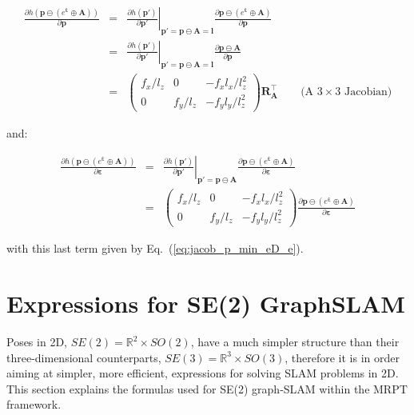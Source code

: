 \documentclass[a4paper,11pt]{report}
\newcommand{\E}{{\bm{\varepsilon}}}
\newcommand{\A}{{\mathbf{A}}}
\begin{document}
\begin{eqnarray}
\frac{\partial h(\mathbf{p} \ominus (e^\E \oplus \A) )}{\partial \mathbf{p}}
&=&
\left. \frac{\partial h(\mathbf{p'})}{\partial \mathbf{p'}} \right|_{ \mathbf{p'} = \mathbf{p} \ominus \A = \mathbf{l} }
\frac{\partial \mathbf{p} \ominus (e^\E \oplus \A) }{\partial \mathbf{p}} \\
&=&
\left. \frac{\partial h(\mathbf{p'})}{\partial \mathbf{p'}} \right|_{ \mathbf{p'} = \mathbf{p} \ominus \A = \mathbf{l} }
\frac{\partial \mathbf{p} \ominus \A }{\partial \mathbf{p}} \\
&=&
\left(
\begin{array}{ccc}
 f_x / l_z   &    0    &  -f_x l_x / l_z^2   \\
 0 & f_y / l_z  &  -f_y l_y / l_z^2
\end{array}
\right)
\mathbf{R_A^\top}
\quad\quad \text{(A $3 \times 3$ Jacobian)}
\end{eqnarray}

\noindent and:

\begin{eqnarray}
\frac{\partial h(\mathbf{p} \ominus (e^\E \oplus \A) )}{\partial \E}
&=&
\left. \frac{\partial h(\mathbf{p'})}{\partial \mathbf{p'}} \right|_{ \mathbf{p'} = \mathbf{p} \ominus \A }
\frac{\partial \mathbf{p} \ominus (e^\E \oplus \A) }{\partial \E} \\
&=&
\left(
\begin{array}{ccc}
 f_x / l_z   &    0    &  -f_x l_x / l_z^2   \\
 0 & f_y / l_z  &  -f_y l_y / l_z^2
\end{array}
\right)
\frac{\partial \mathbf{p} \ominus (e^\E \oplus \A) }{\partial \E}
\end{eqnarray}

\noindent with this last term given by Eq.~(\ref{eq:jacob_p_min_eD_e}).


\chapter{Expressions for SE(2) GraphSLAM}
\label{ch:apx:se2}

Poses in 2D, $SE(2)=\mathbb{R}^2 \times SO(2)$, have a much simpler structure than 
their three-dimensional counterparts, $SE(3)=\mathbb{R}^3 \times SO(3)$, therefore 
it is in order aiming at simpler, more efficient, expressions for solving SLAM problems in 2D.
This section explains the formulas used for SE(2) graph-SLAM within 
the MRPT framework.
\end{document}
